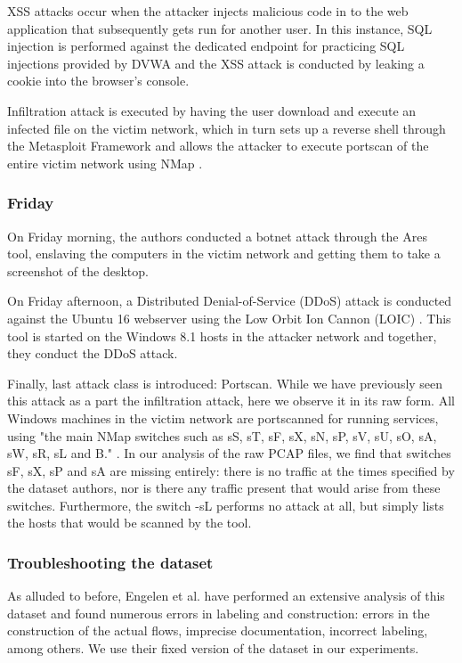 XSS attacks occur when the attacker injects malicious code in to the web application that subsequently gets run for another user. In this instance, SQL injection is performed against the dedicated endpoint for practicing SQL injections provided by DVWA and the XSS attack is conducted by leaking a cookie into the browser's console. 

Infiltration attack is executed by having the user download and execute an infected file on the victim network, which in turn sets up a reverse shell through the Metasploit Framework \cite{metasploit} and allows the attacker to execute portscan of the entire victim network using NMap \cite{nmap}.

\subsubsection{Friday}
On Friday morning, the authors conducted a botnet attack through the Ares \cite{ares} tool, enslaving the computers in the victim network and getting them to take a screenshot of the desktop. 

On Friday afternoon, a Distributed Denial-of-Service (DDoS) attack is conducted against the Ubuntu 16 webserver using the Low Orbit Ion Cannon (LOIC) \cite{loic}. This tool is started on the Windows 8.1 hosts in the attacker network and together, they conduct the DDoS attack.

Finally, last attack class is introduced: Portscan. While we have previously seen this attack as a part the infiltration attack, here we observe it in its raw form. All Windows machines in the victim network are portscanned for running services, using "the main NMap switches such as sS, sT, sF, sX, sN, sP, sV, sU, sO, sA, sW, sR, sL and B." \cite{cic_2017}. In our analysis of the raw PCAP files, we find that switches sF, sX, sP and sA are missing entirely: there is no traffic at the times specified by the dataset authors, nor is there any traffic present that would arise from these switches. Furthermore, the switch -sL performs no attack at all, but simply lists the hosts that would be scanned by the tool. 

\subsubsection{Troubleshooting the dataset}
As alluded to before, Engelen et al. \cite{troubleshooting_cic2017} have performed an extensive analysis of this dataset and found numerous errors in labeling and construction: errors in the construction of the actual flows, imprecise documentation, incorrect labeling, among others. We use their fixed version of the dataset in our experiments.

